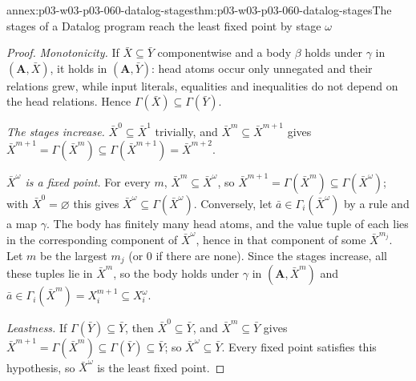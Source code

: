 \begin{annexitem}{annex:p03-w03-p03-060-datalog-stages}{thm:p03-w03-p03-060-datalog-stages}{The stages of a Datalog program reach the least fixed point by stage \(\omega\)}
\begin{proof}
\emph{Monotonicity.} If \(\bar X\subseteq\bar Y\) componentwise and a body
\(\beta\) holds under \(\gamma\) in \((\mathbf A,\bar X)\), it holds in
\((\mathbf A,\bar Y)\): head atoms occur only unnegated and their relations
grew, while input literals, equalities and inequalities do not depend on
the head relations. Hence \(\Gamma(\bar X)\subseteq\Gamma(\bar Y)\).

\emph{The stages increase.} \(\bar X^0\subseteq\bar X^1\) trivially, and
\(\bar X^m\subseteq\bar X^{m+1}\) gives
\(\bar X^{m+1}=\Gamma(\bar X^m)\subseteq\Gamma(\bar X^{m+1})=\bar X^{m+2}\).

\emph{\(\bar X^\omega\) is a fixed point.} For every \(m\),
\(\bar X^m\subseteq\bar X^\omega\), so
\(\bar X^{m+1}=\Gamma(\bar X^m)\subseteq\Gamma(\bar X^\omega)\); with
\(\bar X^0=\varnothing\) this gives
\(\bar X^\omega\subseteq\Gamma(\bar X^\omega)\). Conversely, let
\(\bar a\in\Gamma_i(\bar X^\omega)\) by a rule and a map \(\gamma\). The
body has finitely many head atoms, and the value tuple of each lies in the
corresponding component of \(\bar X^\omega\), hence in that component of
some \(\bar X^{m_j}\). Let \(m\) be the largest \(m_j\) (or \(0\) if there
are none). Since the stages increase, all these tuples lie in
\(\bar X^m\), so the body holds under \(\gamma\) in
\((\mathbf A,\bar X^m)\) and \(\bar a\in\Gamma_i(\bar X^m)=X^{m+1}_i\subseteq X^\omega_i\).

\emph{Leastness.} If \(\Gamma(\bar Y)\subseteq\bar Y\), then
\(\bar X^0\subseteq\bar Y\), and \(\bar X^m\subseteq\bar Y\) gives
\(\bar X^{m+1}=\Gamma(\bar X^m)\subseteq\Gamma(\bar Y)\subseteq\bar Y\); so
\(\bar X^\omega\subseteq\bar Y\). Every fixed point satisfies this
hypothesis, so \(\bar X^\omega\) is the least fixed point.
\end{proof}
\end{annexitem}

